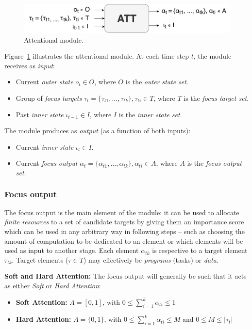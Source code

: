 \documentclass[12pt]{article}
\begin{document}
\begin{figure}[H]
    \centering
    \includegraphics[width=1.0\linewidth]{./img/alt_att_block.pdf}
    \caption{Attentional module.}
    \label{fig:attmodule}
\end{figure}

Figure~\ref{fig:attmodule} illustrates the attentional module. At each time step $t$, the module receives as \emph{input}:
\begin{itemize}
    \item Current \emph{outer state} $o_t \in O$, where $O$ is the \emph{outer state set}.
    \item Group of \emph{focus targets} $\tau_t = \{\tau_{t1}, \ldots, \tau_{tk}\}, \tau_{ti} \in T$, where $T$ is the \emph{focus target set}.
    \item Past \emph{inner state} $\iota_{t-1} \in I$, where $I$ is the \emph{inner state set}.
\end{itemize}

The module produces as \emph{output} (as a function of both inputs):
\begin{itemize}
    \item Current \emph{inner state} $\iota_t \in I$.
    \item Current \emph{focus output} $\alpha_t = \{\alpha_{t1}, \ldots, \alpha_{tk}\}, \alpha_{ti} \in A$,
        where $A$ is the \emph{focus output set}.
\end{itemize}

\subsubsection{Focus output}
The focus output is the main element of the module: it can be used to allocate \emph{finite resources} to a set of candidate targets by giving them an importance score which can be used in any arbitrary way in following steps -- such as choosing the amount of computation to be dedicated to an element or which elements will be used as input to another stage.
Each element $\alpha_{tk}$ is respective to a target element $\tau_{tk}$.
Target elements ($\tau \in T$) may effectively be \emph{programs} (tasks) or \emph{data}.

\textbf{Soft and Hard Attention:}
The focus output will generally be such that it acts as either \emph{Soft} or \emph{Hard Attention}:
\begin{itemize}
    \item \textbf{Soft Attention:}
        $A = [0, 1]$, with $0 \le \sum_{i=1}^{k} \alpha_{ti} \le 1$
    \item \textbf{Hard Attention:}
        $A = \{0, 1\}$, with $0 \le \sum_{i=1}^{k} \alpha_{ti} \le M$ and $0 \le M \le |\tau_t|$
\end{itemize}
\end{document}
